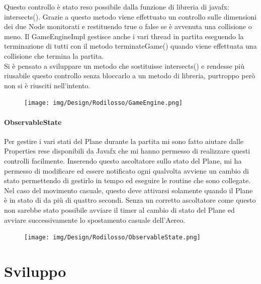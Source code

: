 \documentclass[a4paper,12pt]{report}
\begin{document}
\noindent Questo controllo è stato reso possibile dalla funzione di libreria di javafx: intersects().
Grazie a questo metodo viene effettuato un controllo sulle dimensioni dei due Node monitorati e restituendo true o false se è avvenuta una 
collisione o meno.
Il GameEngineImpl gestisce anche i vari thread in partita eseguendo la terminazione di tutti con il metodo terminateGame() quando viene 
effettuata una collisione che termina la partita.
\\
Si è pensato a sviluppare un metodo che sostituisse intersects() e rendesse più riusabile questo controllo senza bloccarlo a un metodo di 
libreria, purtroppo però non si è riusciti nell’intento.
\begin{figure}[H]
    \begin{center}
        \centering
        \texttt{[image: img/Design/Rodilosso/GameEngine.png]}
    \end{center}
    \label{img:game-engine}
\end{figure}

\subsubsection{ObservableState}
Per gestire i vari stati del Plane durante la partita
mi sono fatto aiutare dalle Properties rese disponibili da Javafx che mi hanno permesso di realizzare questi controlli facilmente.
Inserendo questo ascoltatore sullo stato del Plane, mi ha permesso di modificare ed essere notificato ogni qualvolta avviene un cambio di 
stato permettendo di gestirlo in tempo ed eseguire le routine che sono collegate.
Nel caso del movimento casuale, questo deve attivarsi solamente quando il Plane è in stato di  da più di quattro secondi.
Senza un corretto ascoltatore come questo non sarebbe stato possibile avviare il timer al cambio di stato del Plane ed avviare successivamente 
lo spostamento casuale dell’Aereo.
\begin{figure}[H]
    \begin{center}
        \centering
        \texttt{[image: img/Design/Rodilosso/ObservableState.png]}
    \end{center}
    \label{img:observable}
\end{figure}

\chapter{Sviluppo}

\end{document}
